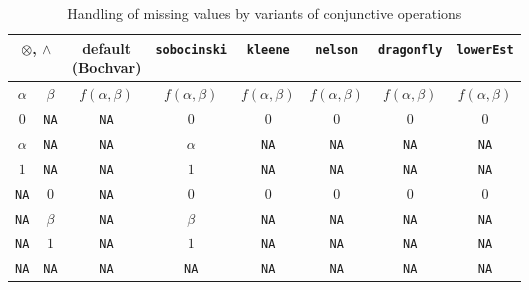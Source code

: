 \documentclass[review]{elsarticle}
\newcommand{\code}[1]{\texttt{#1}}
\begin{document}
\begin{table}
    \centering
    \caption{Handling of missing values by variants of conjunctive operations}
    \label{tab:conjunctions}
    \begin{tabular}{cc|cccccc}
        \multicolumn{2}{c|}{$\otimes$, $\land$} & \makecell{default \\ (Bochvar)} & \texttt{sobocinski} & \texttt{kleene} & \texttt{nelson} & \texttt{dragonfly} & \texttt{lowerEst} \\
        \hline
        $\alpha$    & $\beta$     & $f(\alpha, \beta)$ & $f(\alpha, \beta)$ & $f(\alpha, \beta)$ & $f(\alpha, \beta)$ & $f(\alpha, \beta)$ & $f(\alpha, \beta)$ \\
        $0$         & \code{NA} & \code{NA} & $0$         & $0$         & $0$         & $0$         & $0$         \\
        $\alpha$    & \code{NA} & \code{NA} & $\alpha$    & \code{NA} & \code{NA} & \code{NA} & \code{NA} \\
        $1$         & \code{NA} & \code{NA} & $1$         & \code{NA} & \code{NA} & \code{NA} & \code{NA} \\
        \code{NA} & $0$         & \code{NA} & $0$         & $0$         & $0$         & $0$         & $0$         \\
        \code{NA} & $\beta$     & \code{NA} & $\beta$     & \code{NA} & \code{NA} & \code{NA} & \code{NA} \\
        \code{NA} & $1$         & \code{NA} & $1$         & \code{NA} & \code{NA} & \code{NA} & \code{NA} \\
        \code{NA} & \code{NA} & \code{NA} & \code{NA} & \code{NA} & \code{NA} & \code{NA} & \code{NA} 
    \end{tabular}
\end{table}
\end{document}

